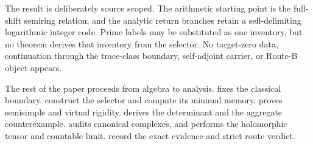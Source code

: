 The result is deliberately source scoped.  The arithmetic starting point is
the full-shift semiring relation, and the analytic return branches retain a
self-delimiting logarithmic integer code.  Prime labels may be substituted as
one inventory, but no theorem derives that inventory from the selector.  No
target-zero data, continuation through the trace-class boundary, self-adjoint
carrier, or Route-B object appears.

The rest of the paper proceeds from algebra to analysis.  
 fixes the classical boundary.
 construct the selector and compute its minimal
memory.   proves semisimple and virtual rigidity.
 derives the determinant and the aggregate counterexample.
 audits canonical complexes, and
 performs the holomorphic tensor and countable limit.
 record the exact evidence and strict route verdict.
